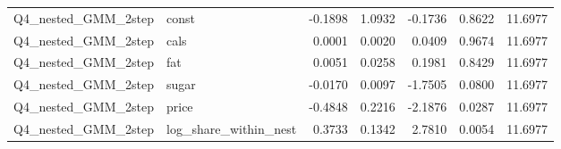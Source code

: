 \begin{longtable}{llrrrrr}
Q4\_nested\_GMM\_2step & const & -0.1898 & 1.0932 & -0.1736 & 0.8622 & 11.6977 \\
Q4\_nested\_GMM\_2step & cals & 0.0001 & 0.0020 & 0.0409 & 0.9674 & 11.6977 \\
Q4\_nested\_GMM\_2step & fat & 0.0051 & 0.0258 & 0.1981 & 0.8429 & 11.6977 \\
Q4\_nested\_GMM\_2step & sugar & -0.0170 & 0.0097 & -1.7505 & 0.0800 & 11.6977 \\
Q4\_nested\_GMM\_2step & price & -0.4848 & 0.2216 & -2.1876 & 0.0287 & 11.6977 \\
Q4\_nested\_GMM\_2step & log\_share\_within\_nest & 0.3733 & 0.1342 & 2.7810 & 0.0054 & 11.6977 \\
\end{longtable}
